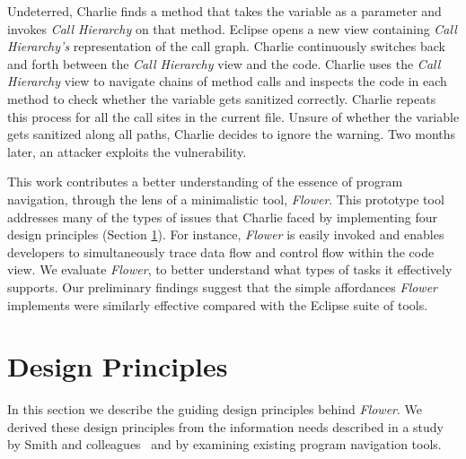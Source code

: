 \documentclass[conference]{IEEEtran}
\begin{document}
Undeterred, Charlie finds a method that takes the variable as a parameter and invokes \emph{Call Hierarchy} on that method.
Eclipse opens a new view containing \emph{Call Hierarchy's} representation of the call graph.
Charlie continuously switches back and forth between the \emph{Call Hierarchy} view and the code.
Charlie uses the \emph{Call Hierarchy} view to navigate chains of method calls and inspects the code in each method to check whether the variable gets sanitized correctly.
Charlie repeats this process for all the call sites in the current file. 
Unsure of whether the variable gets sanitized along all paths, Charlie decides to ignore the warning.
Two months later, an attacker exploits the vulnerability. 

This work contributes a better understanding of the essence of program navigation, through the lens of a minimalistic tool, \textit{Flower}.
This prototype tool addresses many of the types of issues that Charlie faced by implementing four design principles (Section \ref{DesignPrinciples}).
For instance, \textit{Flower} is easily invoked and enables developers to simultaneously trace data flow and control flow within the code view. 
We evaluate \textit{Flower}, to better understand what types of tasks it effectively supports. 
Our preliminary findings suggest that the simple affordances \textit{Flower} implements were similarly effective compared with the Eclipse suite of tools.


\section{Design Principles}
\label{DesignPrinciples}
In this section we describe the guiding design principles behind \textit{Flower}. We derived these design principles from the information needs described in a study by Smith and colleagues~\cite{Smith2015} and by examining existing program navigation tools.
\end{document}
